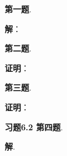 
\renewcommand{\newpageorvspace}{\vspace{2em}}

\date{2022-3-25  第二次习题课}



\maketitle

{\bf 第一题}. 

{\bf 解}：

\newpageorvspace


{\bf 第二题}. 

{\bf 证明}：

\newpageorvspace


{\bf 第三题}. 

{\bf 证明}：


\newpageorvspace


{\bf 习题6.2 第四题}.

{\bf 解}. 



